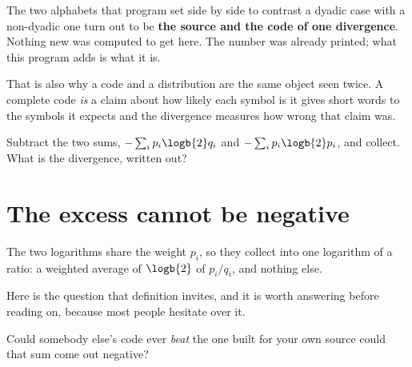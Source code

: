 \begin{fr}

The two alphabets that program set side by side to contrast a dyadic case
with a non-dyadic one turn out to be \textbf{the source and the code of one
divergence}. Nothing new was computed to get here. The number was already
printed; what this program adds is what it is.

\begin{note}
That is also why a code and a distribution are the same object seen twice. A
complete code \emph{is} a claim about how likely each symbol is \dash{} it
gives short words to the symbols it expects \dash{} and the divergence
measures how wrong that claim was.
\end{note}


Subtract the two sums, $-\sum_i p_i \logb{2} q_i$ and
$-\sum_i p_i \logb{2} p_i$, and collect. What is the divergence, written
out?
\dotline
\nextframe
\end{fr}

\section{The excess cannot be negative}
\label{sec:P30-nonneg}

\begin{fr}

The two logarithms share the weight $p_i$, so they collect into one
logarithm of a ratio: a weighted average of $\logb{2}$ of $p_i / q_i$, and
nothing else.

Here is the question that definition invites, and it is worth answering before
reading on, because most people hesitate over it.

Could somebody else's code ever \emph{beat} the one built for your own
source \dash{} could that sum come out negative?
\dotline
\nextframe
\end{fr}

